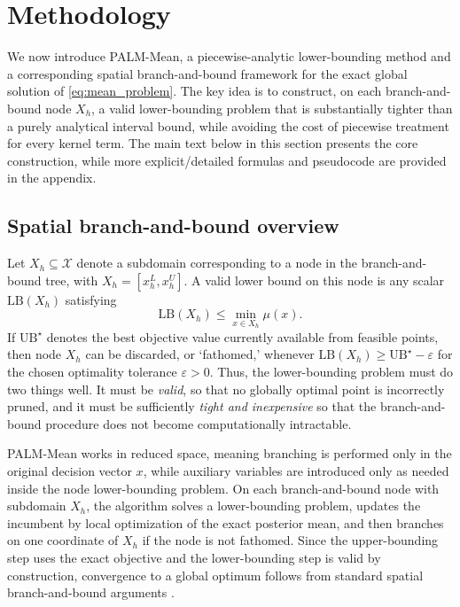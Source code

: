 \documentclass[pdflatex,sn-mathphys-num]{sn-jnl}%
\theoremstyle{thmstyleone}%
\theoremstyle{thmstyletwo}%
\theoremstyle{thmstylethree}%
\begin{document}
\section{Methodology}
\label{sec:methodology}

We now introduce PALM-Mean, a piecewise-analytic lower-bounding method and a corresponding spatial branch-and-bound framework for the exact global solution of \eqref{eq:mean_problem}. The key idea is to construct, on each branch-and-bound node $X_h$, a valid lower-bounding problem that is substantially tighter than a purely analytical interval bound, while avoiding the cost of piecewise treatment for every kernel term. The main text below in this section presents the core construction, while more explicit/detailed formulas and pseudocode are provided in the appendix. 

\subsection{Spatial branch-and-bound overview}

Let $X_h\subseteq\mathcal{X}$ denote a subdomain corresponding to a node in the branch-and-bound tree, with $X_h=[x_h^L,x_h^U]$. A valid lower bound on this node is any scalar $\mathrm{LB}(X_h)$ satisfying
\[
\mathrm{LB}(X_h)\le \min_{x\in X_h}\mu(x).
\]
If $\mathrm{UB}^\star$ denotes the best objective value currently available from feasible points, then node $X_h$ can be discarded, or `fathomed,' whenever $\mathrm{LB}(X_h)\ge \mathrm{UB}^\star-\varepsilon$ for the chosen optimality tolerance $\varepsilon>0$. Thus, the lower-bounding problem must do two things well. It must be \emph{valid}, so that no globally optimal point is incorrectly pruned, and it must be sufficiently \emph{tight and inexpensive} so that the branch-and-bound procedure does not become computationally intractable.

PALM-Mean works in reduced space, meaning branching is performed only in the original decision vector $x$, while auxiliary variables are introduced only as needed inside the node lower-bounding problem. On each branch-and-bound node with subdomain $X_h$, the algorithm solves a lower-bounding problem, updates the incumbent by local optimization of the exact posterior mean, and then branches on one coordinate of $X_h$ if the node is not fathomed. Since the upper-bounding step uses the exact objective and the lower-bounding step is valid by construction, convergence to a global optimum follows from standard spatial branch-and-bound arguments \cite{ref:reduced_space_bb,ref:deterministic_global_opt_text}.
\end{document}
